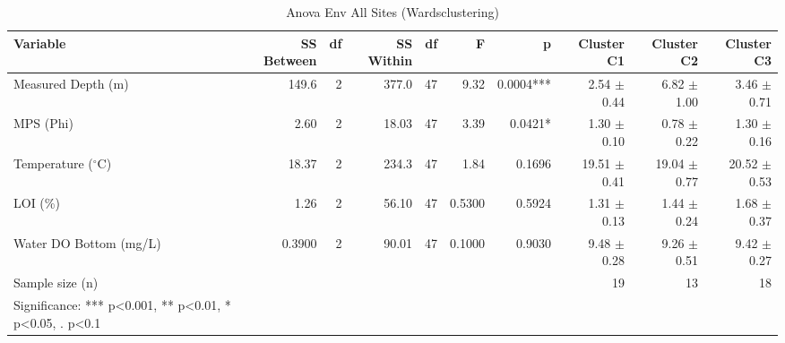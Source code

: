 \begin{table}[htbp]
  \centering
  \caption{Anova Env All Sites (Wardsclustering)}
  \label{tab:WardsClustering_tables_anova_env_all_sites}
  \small
  \begin{tabular}{lrrrrrrrrr}
    \toprule
    Variable & SS Between & df & SS Within & df  & F & p & Cluster C1 & Cluster C2 & Cluster C3 \\
    \midrule
    Measured Depth (m) & 149.6 & 2 & 377.0 & 47 & 9.32 & 0.0004*** & 2.54 $\pm$ 0.44 & 6.82 $\pm$ 1.00 & 3.46 $\pm$ 0.71 \\
    MPS (Phi) & 2.60 & 2 & 18.03 & 47 & 3.39 & 0.0421* & 1.30 $\pm$ 0.10 & 0.78 $\pm$ 0.22 & 1.30 $\pm$ 0.16 \\
    Temperature ($^{\circ}$C) & 18.37 & 2 & 234.3 & 47 & 1.84 & 0.1696 & 19.51 $\pm$ 0.41 & 19.04 $\pm$ 0.77 & 20.52 $\pm$ 0.53 \\
    LOI (\%) & 1.26 & 2 & 56.10 & 47 & 0.5300 & 0.5924 & 1.31 $\pm$ 0.13 & 1.44 $\pm$ 0.24 & 1.68 $\pm$ 0.37 \\
    Water DO Bottom (mg/L) & 0.3900 & 2 & 90.01 & 47 & 0.1000 & 0.9030 & 9.48 $\pm$ 0.28 & 9.26 $\pm$ 0.51 & 9.42 $\pm$ 0.27 \\
    Sample size (n) &  &  &  &  &  &  & 19 & 13 & 18 \\
    Significance: *** p<0.001, ** p<0.01, * p<0.05, . p<0.1 &  &  &  &  &  &  &  &  &  \\
    \bottomrule
  \end{tabular}
\end{table}
